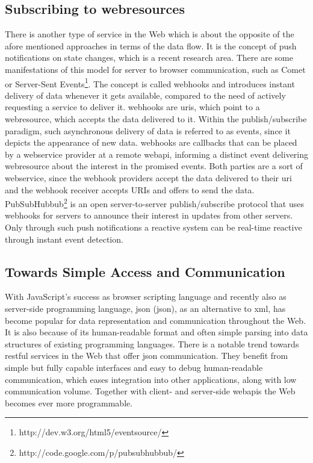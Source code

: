 \subsection{Subscribing to \glspl{webresource}}
There is another type of service in the Web which is about the opposite of the afore mentioned approaches in terms of the data flow.
It is the concept of push notifications on state changes, which is a recent research area.
There are some manifestations of this model for server to browser communication, such as \textrm{Comet}\cite{5631249} or \textrm{Server-Sent Events}\footnote{http://dev.w3.org/html5/eventsource/}.
The concept is called \textrm{\glspl{webhook}} and introduces instant delivery of data whenever it gets available, compared to the need of actively requesting a service to deliver it.
\textrm{\glspl{webhook}} are \textrm{\acrshort{uri}s}, which point to a \textrm{\gls{webresource}}, which accepts the data delivered to it.
Within the publish/subscribe paradigm\cite{Eugster:2003:MFP:857076.857078}, such asynchronous delivery of data is referred to as events, since it depicts the appearance of new data.
\textrm{\glspl{webhook}} are callbacks that can be placed by a \textrm{\gls{webservice}} provider at a remote \textrm{\gls{webapi}}, informing a distinct event delivering \textrm{\gls{webresource}} about the interest in the promised events.
Both parties are a sort of \textrm{\gls{webservice}}, since the \textrm{\gls{webhook}} providers accept the data delivered to their \textrm{\acrshort{uri}} and the \textrm{\gls{webhook}} receiver accepts \textrm{URIs} and offers to send the data.
\textrm{PubSubHubbub}\footnote{http://code.google.com/p/pubsubhubbub/} is an open server-to-server publish/subscribe protocol that uses \textrm{\glspl{webhook}} for servers to announce their interest in updates from other servers.
Only through such push notifications a reactive system can be real-time reactive through instant event detection.


\subsection{Towards Simple Access and Communication}
With JavaScript's success as browser scripting language and recently also as server-side programming language, \textrm{\acrlong{json} (\acrshort{json})}, as an alternative to \textrm{\acrshort{xml}}, has become popular for data representation and communication throughout the Web.
It is also because of its human-readable format and often simple parsing into data structures of existing programming languages.
There is a notable trend towards \textrm{\acrshort{rest}ful} services in the Web that offer \textrm{\acrshort{json}} communication.
They benefit from simple but fully capable interfaces and easy to debug human-readable communication, which eases integration into other applications, along with low communication volume.
Together with client- and server-side \textrm{\gls{webapi}s} the Web becomes ever more programmable.



